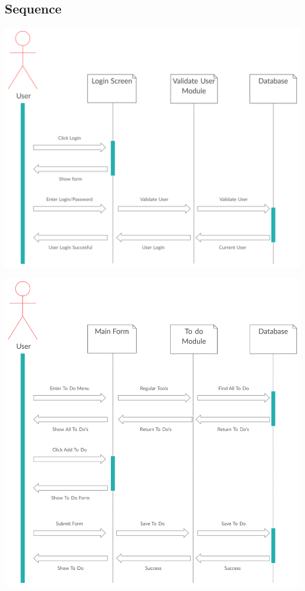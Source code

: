 \subsection{Sequence}
\par
\includegraphics[width=\textwidth]{secuence digrram1}
\par
\includegraphics[width=\textwidth]{secuence digrram2}



\clearpage